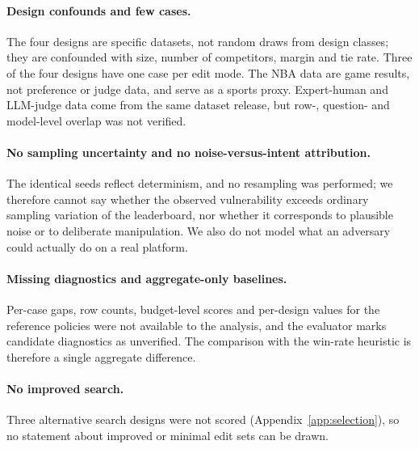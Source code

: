 \documentclass{article}
\begin{document}
\paragraph{Design confounds and few cases.} The four designs are specific datasets, not random draws from design classes; they are confounded with size, number of competitors, margin and tie rate. Three of the four designs have one case per edit mode. The NBA data are game results, not preference or judge data, and serve as a sports proxy. Expert-human and LLM-judge data come from the same dataset release, but row-, question- and model-level overlap was not verified.
\paragraph{No sampling uncertainty and no noise-versus-intent attribution.} The identical seeds reflect determinism, and no resampling was performed; we therefore cannot say whether the observed vulnerability exceeds ordinary sampling variation of the leaderboard, nor whether it corresponds to plausible noise or to deliberate manipulation. We also do not model what an adversary could actually do on a real platform.
\paragraph{Missing diagnostics and aggregate-only baselines.} Per-case gaps, row counts, budget-level scores and per-design values for the reference policies were not available to the analysis, and the evaluator marks candidate diagnostics as unverified. The comparison with the win-rate heuristic is therefore a single aggregate difference.
\paragraph{No improved search.} Three alternative search designs were not scored (Appendix~\ref{app:selection}), so no statement about improved or minimal edit sets can be drawn.
\end{document}

